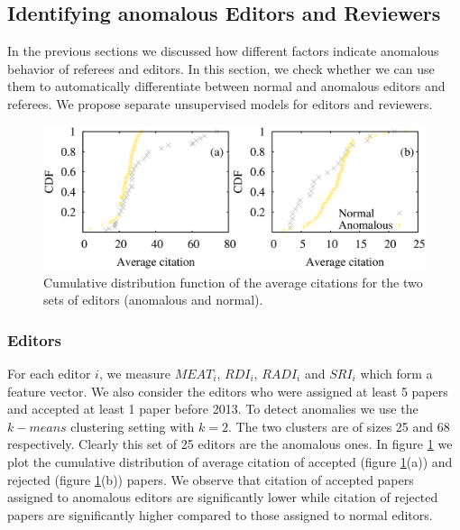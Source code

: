 \noindent
\subsection{Identifying anomalous Editors and Reviewers}
\label{prediction}


In the previous sections we discussed how different factors indicate anomalous behavior of referees and editors. In this section, we check whether we can use them to automatically differentiate between normal and anomalous editors and referees. We propose separate unsupervised models for editors and reviewers.

\begin{figure}
\centering
\includegraphics[scale=0.27]{./texfiles/Chapter_4/cikm/figures/editor_all_anom.eps}
\caption{\label{ed_pred}Cumulative distribution function of the average citations for the two sets of editors (anomalous and normal).\vspace{4mm}} 
\end{figure}


\subsubsection{Editors}
For each editor $i$, we measure $MEAT_{i}$, $RDI_{i}$, $RADI_{i}$ and $SRI_{i}$ which form a feature vector. 
We also consider the editors who were assigned at least 5 papers and accepted at least 1 paper before 2013. 
To detect anomalies we use the 
$k-means$ clustering setting with $k=2$. The two clusters are of sizes 25 and 68 respectively. Clearly this set of 25 editors are the anomalous ones.
In figure \ref{ed_pred} we plot the cumulative distribution of average citation of accepted (figure \ref{ed_pred}(a)) and rejected  (figure \ref{ed_pred}(b)) papers. We observe that citation of accepted papers assigned to anomalous editors are significantly lower while citation of rejected papers are significantly higher compared to those assigned to normal editors.


